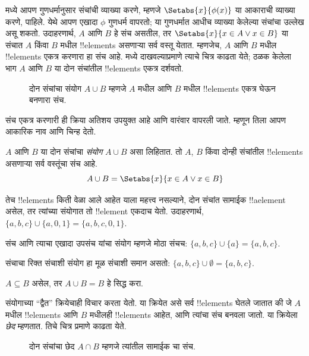 \documentclass[../../../include/open-logic-section]{subfiles}
\begin{document}

\begin{explain}
 मध्ये आपण गुणधर्मानुसार संचांची व्याख्या करणे,
म्हणजे $\Setabs{x}{\phi(x)}$ या आकाराची व्याख्या करणे, पाहिले.
येथे आपण एखादा $\phi$ गुणधर्म वापरतो; या गुणधर्मात आधीच व्याख्या केलेल्या
संचांचा उल्लेख असू शकतो. उदाहरणार्थ, $A$ आणि $B$ हे संच असतील,
तर $\Setabs{x}{x \in A \lor x \in B}$ या संचात $A$ किंवा $B$ मधील
!!{element}s असणाऱ्या सर्व वस्तू येतात. म्हणजेच, $A$ आणि $B$ मधील
!!{element}s एकत्र करणारा हा संच आहे.  मध्ये
दाखवल्याप्रमाणे त्याचे चित्र काढता येते; ठळक केलेला भाग $A$ आणि $B$
या दोन संचांतील !!{element}s एकत्र दर्शवतो.

\begin{figure}
  \caption{दोन संचांचा संयोग $A \cup B$ म्हणजे $A$ मधील आणि $B$ मधील
    !!{element}s एकत्र घेऊन बनणारा संच.}
\end{figure}

संच एकत्र करणारी ही क्रिया अतिशय उपयुक्त आहे आणि वारंवार वापरली जाते.
म्हणून तिला आपण आकारिक नाव आणि चिन्ह देतो.
\end{explain}

\begin{defn}[संयोग]
$A$ आणि $B$ या दोन संचांचा \emph{संयोग} $A \cup B$ असा लिहितात.
तो $A$, $B$ किंवा दोन्ही संचांतील !!{element}s असणाऱ्या सर्व वस्तूंचा संच आहे.
\[
A \cup B = \Setabs{x}{x \in A \lor x \in B}
\]
\end{defn}

\begin{ex}
तेच !!{element}s किती वेळा आले आहेत याला महत्त्व नसल्याने, दोन संचांत
सामाईक !!a{element} असेल, तर त्यांच्या संयोगात तो !!{element} एकदाच येतो.
उदाहरणार्थ, $\{ a, b, c\} \cup \{ a, 0, 1\} = \{a, b, c, 0, 1\}$.

संच आणि त्याचा एखादा उपसंच यांचा संयोग म्हणजे मोठा संचच:
$\{a,
b, c \} \cup \{a \} = \{a, b, c\}$.

संचाचा रिक्त संचाशी संयोग हा मूळ संचाशी समान असतो:
$\{a,
b, c \} \cup \emptyset = \{a, b, c \}$.
\end{ex}

\begin{prob}
$A \subseteq B$ असेल, तर $A \cup B = B$ हे सिद्ध करा.
\end{prob}

\begin{explain}
संयोगाच्या ``द्वैत'' क्रियेचाही विचार करता येतो. या क्रियेत असे सर्व
!!{element}s घेतले जातात की जे $A$ मधील !!{element}s आणि
$B$ मधीलही !!{element}s आहेत, आणि त्यांचा संच बनवला जातो.
या क्रियेला \emph{छेद} म्हणतात. तिचे चित्र  प्रमाणे काढता येते.
\begin{figure}
  \caption{दोन संचांचा छेद $A \cap B$ म्हणजे त्यांतील सामाईक
    चा संच.}
\end{figure}
\end{explain}
\end{document}
